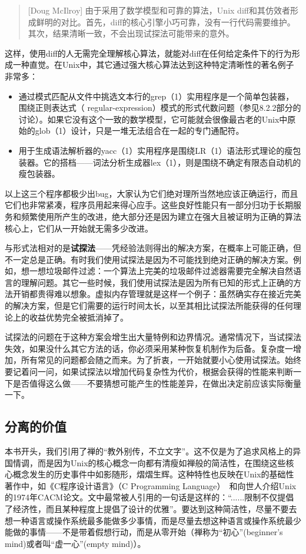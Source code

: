 \documentclass[12pt,oneside]{ctexbook}
\begin{document}
\begin{common-format}
\begin{quote}[Doug McIlroy]
由于采用了数学模型和可靠的算法，Unix diff和其仿效者形成鲜明的对比。首先，diff的核心引擎小巧可靠，没有一行代码需要维护。其次，结果清晰一致，不会出现试探法可能带来的意外。
\end{quote}

这样，使用diff的人无需完全理解核心算法，就能对diff在任何给定条件下的行为形成一种直觉。在Unix中，其它通过强大核心算法达到这种特定清晰性的著名例子非常多：

\begin{itemize}
\item 通过模式匹配从文件中挑选文本行的grep（1）实用程序是一个简单包装器，围绕正则表达式（ regular-expression）模式的形式代数问题（参见8.2.2部分的讨论）。如果它没有这个一致的数学模型，它可能就会很像最古老的Unix中原始的glob（1）设计，只是一堆无法组合在一起的专门通配符。
\item 用于生成语法解析器的yacc（1）实用程序是围绕LR（1）语法形式理论的瘦包装器。它的搭档——词法分析生成器lex（1），则是围绕不确定有限态自动机的瘦包装器。
\end{itemize}

以上这三个程序都极少出bug，大家认为它们绝对理所当然地应该正确运行，而且它们也非常紧凑，程序员用起来得心应手。这些良好性能只有一部分归功于长期服务和频繁使用所产生的改进，绝大部分还是因为建立在强大且被证明为正确的算法核心上，它们从一开始就无需多少改进。

与形式法相对的是\textbf{试探法}——凭经验法则得出的解决方案，在概率上可能正确，但不一定总是正确。有时我们使用试探法是因为不可能找到绝对正确的解决方案。例如，想一想垃圾邮件过滤：一个算法上完美的垃圾邮件过滤器需要完全解决自然语言的理解问题。其它一些时候，我们使用试探法是因为所有已知的形式上正确的方法开销都贵得难以想象。虚拟内存管理就是这样一个例子：虽然确实存在接近完美的解决方案，但是它们需要的运行时间太长，以至其相比试探法所能获得的任何理论上的收益优势完全被抵消掉了。

试探法的问题在于这种方案会增生出大量特例和边界情况。通常情况下，当试探法失效，如果没什么其它方法的话，你必须采用某种恢复机制作为后备。复杂度一增加，所有常见的问题都会随之而来。为了折衷，一开始就要小心使用试探法。始终要记着问一问，如果试探法以增加代码复杂性为代价，根据会获得的性能来判断一下是否值得这么做——不要猜想可能产生的性能差异，在做出决定前应该实际衡量一下。

\subsection{分离的价值}
本书开头，我们引用了禅的“教外别传，不立文字”。这不仅是为了追求风格上的异国情调，而是因为Unix的核心概念一向都有清瘦如禅般的简洁性，在围绕这些核心概念发生的历史事件中如影随形，熠熠生辉。这种特性也反映在Unix的基础性著作中，如《C程序设计语言》（C Programming Language）~\cite{Kernighan-Ritchie}和向世人介绍Unix的1974年CACM论文。文中最常被人引用的一句话是这样的：“......限制不仅提倡了经济性，而且某种程度上提倡了设计的优雅”。要达到这种简洁性，尽量不要去想一种语言或操作系统最多能做多少事情，而是尽量去想这种语言或操作系统最少能做的事情——不是带着假想行动，而是从零开始（禅称为“初心”(beginner's mind)或者叫“虚一心”(empty mind)）。


\end{common-format}
\end{document}
